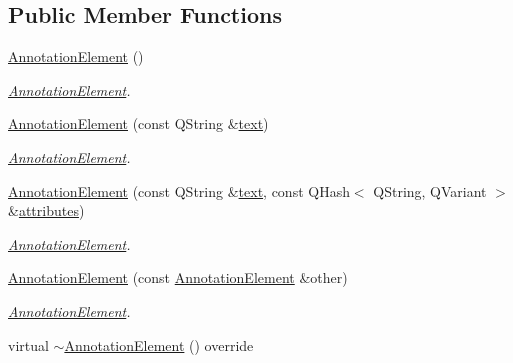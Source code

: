 \subsection*{Public Member Functions}
\begin{DoxyCompactItemize}
\item 
\mbox{\label{class_annotation_element_a8a7015a798a7b3dba1f55ab5482db2be}} 
\hyperlink{class_annotation_element_a8a7015a798a7b3dba1f55ab5482db2be}{Annotation\+Element} ()
\begin{DoxyCompactList}\small\item\em \hyperlink{class_annotation_element}{Annotation\+Element}. \end{DoxyCompactList}\item 
\hyperlink{class_annotation_element_a77b837f3d7eb7d450b1aca83765a488f}{Annotation\+Element} (const Q\+String \&\hyperlink{class_annotation_element_aa59bd98501e3882990681f6aff2ee863}{text})
\begin{DoxyCompactList}\small\item\em \hyperlink{class_annotation_element}{Annotation\+Element}. \end{DoxyCompactList}\item 
\hyperlink{class_annotation_element_a12c2571e880beacafbceadb16b6bd0bb}{Annotation\+Element} (const Q\+String \&\hyperlink{class_annotation_element_aa59bd98501e3882990681f6aff2ee863}{text}, const Q\+Hash$<$ Q\+String, Q\+Variant $>$ \&\hyperlink{class_annotation_element_a58082d92f50c4fde2d18ce24ef3fd283}{attributes})
\begin{DoxyCompactList}\small\item\em \hyperlink{class_annotation_element}{Annotation\+Element}. \end{DoxyCompactList}\item 
\hyperlink{class_annotation_element_a9add1ee0c531f6b65743e691a42991fe}{Annotation\+Element} (const \hyperlink{class_annotation_element}{Annotation\+Element} \&other)
\begin{DoxyCompactList}\small\item\em \hyperlink{class_annotation_element}{Annotation\+Element}. \end{DoxyCompactList}\item 
\mbox{\label{class_annotation_element_a289fc117206f35b038a4aaa5c335aba3}} 
virtual \hyperlink{class_annotation_element_a289fc117206f35b038a4aaa5c335aba3}{$\sim$\+Annotation\+Element} () override

\end{DoxyCompactItemize}
